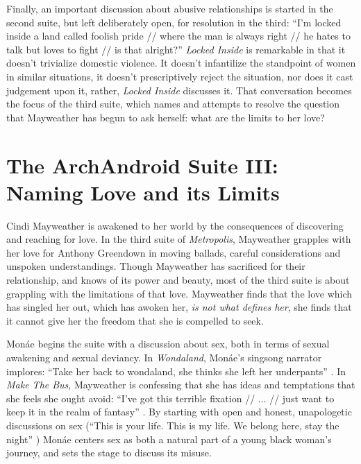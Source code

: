 \documentclass[a4paper, 11pt]{article} %
\begin{document}
Finally, an important discussion about abusive relationships is started in the second suite, but left deliberately open, for resolution in the third:
``I'm locked inside a land called foolish pride // where the man is always right // he hates to talk but loves to fight // is that alright?'' \cite{lockedinside}
\emph{Locked Inside} is remarkable in that it doesn't trivialize domestic violence. 
It doesn't infantilize the standpoint of women in similar situations, it doesn't prescriptively reject the situation, nor does it cast judgement upon it, rather, \emph{Locked Inside} discusses it.
That conversation becomes the focus of the third suite, which names and attempts to resolve the question that Mayweather has begun to ask herself:
what are the limits to her love?


\section*{The ArchAndroid Suite III: Naming Love and its Limits}

Cindi Mayweather is awakened to her world by the consequences of discovering and reaching for love.
In the third suite of \emph{Metropolis}, Mayweather grapples with her love for Anthony Greendown in moving ballads, careful considerations and unspoken understandings.
Though Mayweather has sacrificed for their relationship, and knows of its power and beauty, most of the third suite is about grappling with the limitations of that love.
Mayweather finds that the love which has singled her out, which has awoken her, \emph{is not what defines her}, she finds that it cannot give her the freedom that she is compelled to seek.

Mon\'ae begins the suite with a discussion about sex, both in terms of sexual awakening and sexual deviancy.
In \emph{Wondaland}, Mon\'ae's singsong narrator implores: ``Take her back to wondaland, she thinks she left her underpants'' \cite{wondaland}.
In \emph{Make The Bus}, Mayweather is confessing that she has ideas and temptations that she feels she ought avoid:
``I've got this terrible fixation // ... // just want to keep it in the realm of fantasy'' \cite{makethebus}.
By starting with open and honest, unapologetic discussions on sex (``This is your life. This is my life. We belong here, stay the night'' \cite{wondaland}) 
Mon\'ae centers sex as both a natural part of a young black woman's journey, and sets the stage to discuss its misuse.
\end{document}
